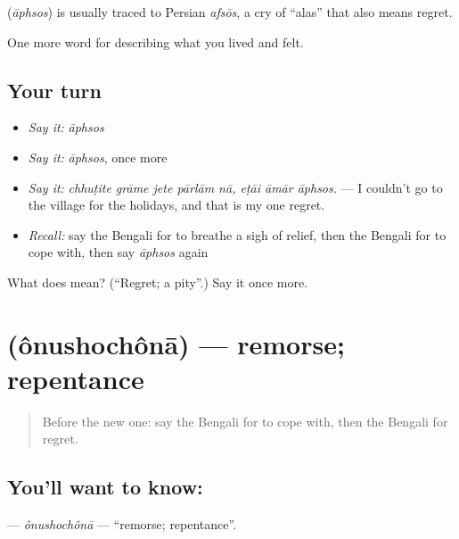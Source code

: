 \begin{cousinweb}
\textbf{} (\emph{āphsos}) is usually traced to Persian \emph{afsōs}, a cry of \textquotedblleft{}alas\textquotedblright{} that also means regret.
\end{cousinweb}

\begin{grammarlens}[title={What you've built}]
One more word for describing what you lived and felt.
\end{grammarlens}

\subsection*{Your turn}
\begin{itemize}
\raggedright
  \item \emph{Say it:} \emph{āphsos}
  \item \emph{Say it:} \emph{āphsos}, once more
  \item \emph{Say it:} \emph{chhuṭite grāme jete pārlām nā, eṭāi āmār āphsos.} — I couldn't go to the village for the holidays, and that is my one regret.
  \item \emph{Recall:} say the Bengali for to breathe a sigh of relief, then the Bengali for to cope with, then say \emph{āphsos} again
\end{itemize}

\begin{tcolorbox}[breakable,colback=teal!4,colframe=teal!35!black,title={Before you move on}]
What does  mean? (\textquotedblleft{}Regret; a pity\textquotedblright{}.) Say it once more.
\end{tcolorbox}
\section[\texorpdfstring{\bn{অনুশোচনা} (ônushochônā)}{অনুশোচনা (ônushochônā)}]{ (ônushochônā) — remorse; repentance}

\label{lesson:BN-C447-onushochona}



\begin{quote}
Before the new one: say the Bengali for to cope with, then the Bengali for regret.
\end{quote}

\subsection*{You'll want to know: }
\textbf{} — \emph{ônushochônā} — \textquotedblleft{}remorse; repentance\textquotedblright{}.

